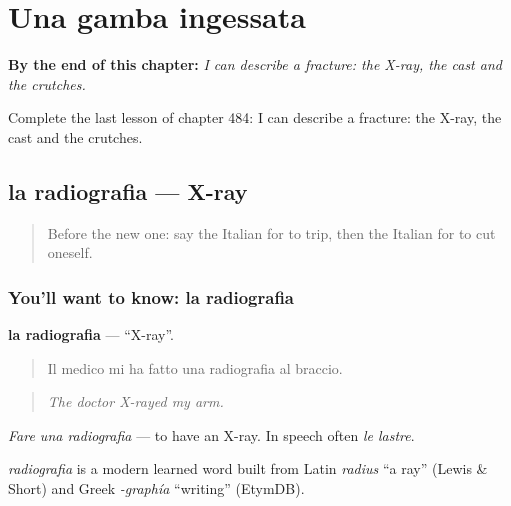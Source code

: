 
\chapter{Una gamba ingessata}
\label{ch:it-una-gamba-ingessata}

\begin{chapteropening}
\textbf{By the end of this chapter:} \emph{I can describe a fracture: the X-ray, the cast and the crutches.}

Complete the last lesson of chapter 484: I can describe a fracture: the X-ray, the cast and the crutches.
\end{chapteropening}

\section[la radiografia]{la radiografia — X-ray}

\label{lesson:IT-C484-radiografia}



\begin{quote}
Before the new one: say the Italian for to trip, then the Italian for to cut oneself.
\end{quote}

\subsection*{You'll want to know: la radiografia}
\textbf{la radiografia} — \textquotedblleft{}X-ray\textquotedblright{}.

\begin{quote}
Il medico mi ha fatto una radiografia al braccio.
\end{quote}

\begin{quote}
\emph{The doctor X-rayed my arm.}
\end{quote}

\emph{Fare una radiografia} — to have an X-ray. In speech often \emph{le lastre}.

\begin{cousinweb}
\emph{radiografia} is a modern learned word built from Latin \emph{radius} \textquotedblleft{}a ray\textquotedblright{} (Lewis \& Short) and Greek \emph{-graphía} \textquotedblleft{}writing\textquotedblright{} (EtymDB).
\end{cousinweb}

